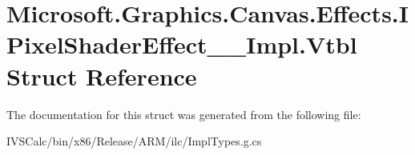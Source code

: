 \hypertarget{struct_microsoft_1_1_graphics_1_1_canvas_1_1_effects_1_1_i_pixel_shader_effect_____impl_1_1_vtbl}{}\section{Microsoft.\+Graphics.\+Canvas.\+Effects.\+I\+Pixel\+Shader\+Effect\+\_\+\+\_\+\+Impl.\+Vtbl Struct Reference}
\label{struct_microsoft_1_1_graphics_1_1_canvas_1_1_effects_1_1_i_pixel_shader_effect_____impl_1_1_vtbl}


The documentation for this struct was generated from the following file\+:\begin{DoxyCompactItemize}
\item 
I\+V\+S\+Calc/bin/x86/\+Release/\+A\+R\+M/ilc/Impl\+Types.\+g.\+cs\end{DoxyCompactItemize}

